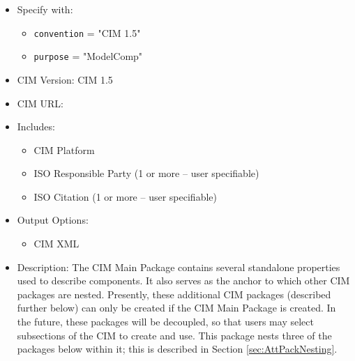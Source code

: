 \begin{itemize}
    \item Specify with:
    \begin{itemize}
        \item {\tt convention} = "CIM 1.5"
        \item {\tt purpose} = "ModelComp"
    \end{itemize}
    \item CIM Version: CIM 1.5
    \item CIM URL: 
    \item Includes:
    \begin{itemize}
       \item CIM Platform
       \item ISO Responsible Party (1 or more -- user specifiable)
       \item ISO Citation (1 or more -- user specifiable)
    \end{itemize}
    \item Output Options:
    \begin{itemize}
        \item CIM XML
    \end{itemize}
    \item Description: The CIM Main Package contains several standalone properties used to describe components. It also serves as the anchor to which other CIM packages are nested. Presently, these additional CIM packages (described further below) can only be created if the CIM Main Package is created. In the future, these packages will be decoupled, so that users may select subsections of the CIM to create and use. This package nests three of the packages below within it; this is described in Section \ref{sec:AttPackNesting}.
\end{itemize}


